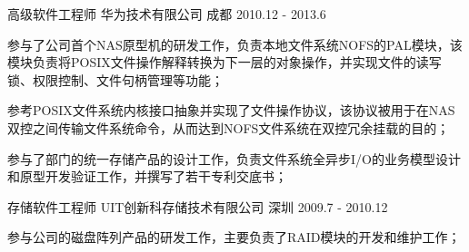 \begin{cventries}
  \cventry
    {高级软件工程师} %
    {华为技术有限公司} %
    {成都} %
    {2010.12 - 2013.6} %
    {
      \begin{cvitems} %
        \item {参与了公司首个NAS原型机的研发工作，负责本地文件系统NOFS的PAL模块，该模块负责将POSIX文件操作解释转换为下一层的对象操作，并实现文件的读写锁、权限控制、文件句柄管理等功能；}
        \item {参考POSIX文件系统内核接口抽象并实现了文件操作协议，该协议被用于在NAS双控之间传输文件系统命令，从而达到NOFS文件系统在双控冗余挂载的目的；}
        \item {参与了部门的统一存储产品的设计工作，负责文件系统全异步I/O的业务模型设计和原型开发验证工作，并撰写了若干专利交底书；}
      \end{cvitems}
    }


  \cventry
    {存储软件工程师} %
    {UIT创新科存储技术有限公司} %
    {深圳} %
    {2009.7 - 2010.12} %
    {
      \begin{cvitems} %
        \item {参与公司的磁盘阵列产品的研发工作，主要负责了RAID模块的开发和维护工作；}
      \end{cvitems}
    }


\end{cventries}
